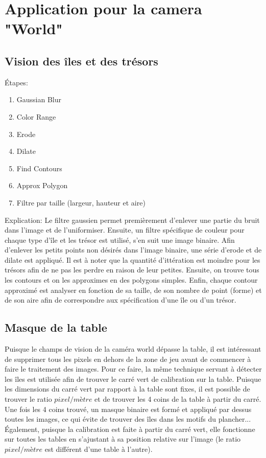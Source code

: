 \section{Application pour la camera "World"} 

\subsection{Vision des îles et des trésors}

Étapes:
\begin{enumerate}
\item Gaussian Blur
\item Color Range
\item Erode
\item Dilate
\item Find Contours
\item Approx Polygon
\item Filtre par taille (largeur, hauteur et aire)
\end{enumerate}

Explication: Le filtre gaussien permet premièrement d'enlever une partie du bruit dans l'image et de l'uniformiser. Ensuite, un filtre spécifique de couleur pour chaque type d'île et les trésor est utilisé, s'en suit une image binaire. Afin d'enlever les petits points non désirés dans l'image binaire, une série d'erode et de dilate est appliqué. Il est à noter que la quantité d'ittération est moindre pour les trésors afin de ne pas les perdre en raison de leur petites. Ensuite, on trouve tous les contours et on les approximes en des polygons simples. Enfin, chaque contour approximé est analyser en fonction de sa taille, de son nombre de point (forme) et de son aire afin de correspondre aux spécification d'une île ou d'un trésor. 

\subsection{Masque de la table}

Puisque le champs de vision de la caméra world dépasse la table, il est intéressant de supprimer tous les pixels en dehors de la zone de jeu avant de commencer à faire le traitement des images. Pour ce faire, la même technique servant à détecter les îles est utilisée afin de trouver le carré vert de calibration sur la table. Puisque les dimensions du carré vert par rapport à la table sont fixes, il est possible de trouver le ratio $pixel/mètre$ et de trouver les 4 coins de la table à partir du carré. Une fois les 4 coins trouvé, un masque binaire est formé et appliqué par dessus toutes les images, ce qui évite de trouver des îles dans les motifs du plancher... Également, puisque la calibration est faite à partir du carré vert, elle fonctionne sur toutes les tables en s'ajustant à sa position relative sur l'image (le ratio $pixel/mètre$ est différent d'une table à l'autre).


